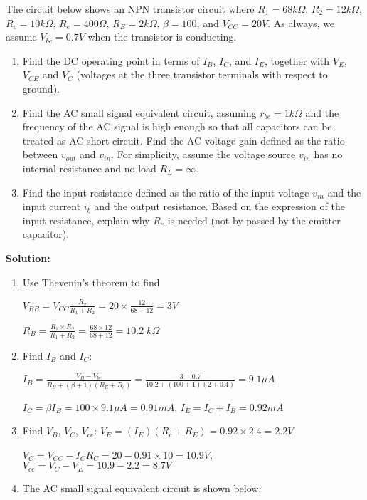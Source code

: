 \begin{enumerate}
The circuit below shows an NPN transistor circuit where $R_1=68k\Omega$,
$R_2=12k\Omega$, $R_c=10k\Omega$, $R_e=400\Omega$, $R_E=2k\Omega$, 
$\beta=100$, and $V_{CC}=20V$. As always, we assume $V_{be}=0.7V$ when
the transistor is conducting.


\begin{enumerate}
\item Find the DC operating point in terms of $I_B$, $I_C$, and $I_E$, 
  together with $V_E$, $V_{CE}$ and $V_C$ (voltages at the three transistor 
  terminals with respect to ground). 
\item Find the AC small signal equivalent circuit, assuming $r_{be}=1k\Omega$
  and the frequency of the AC signal is high enough so that all capacitors 
  can be treated as AC short circuit. Find the AC voltage gain defined as the 
  ratio between $v_{out}$ and $v_{in}$. For simplicity, assume the voltage
  source $v_{in}$ has no internal resistance and no load $R_L=\infty$.
\item Find the input resistance defined as the ratio of the input voltage
  $v_{in}$ and the input current $i_b$ and the output resistance. Based on
  the expression of the input resistance, explain why $R_e$ is needed (not
  by-passed by the emitter capacitor).
\end{enumerate}

{\bf Solution:}
\begin{enumerate}
\item Use Thevenin's theorem to find 

  $V_{BB}=V_{CC}\frac{R_2}{R_1+R_2}=20\times \frac{12}{68+12}=3V$

  $R_B=\frac{R_1\times R_2}{R_1+R_2}=\frac{68\times 12}{68+12}=10.2\;k\Omega$
\item Find $I_B$ and $I_C$:

  $I_B=\frac{V_B-V_{be}}{R_B+(\beta+1)(R_E+R_e)}
  =\frac{3-0.7}{10.2+(100+1)(2+0.4)}=9.1\mu A$

  $I_C=\beta I_B=100\times 9.1\mu A=0.91 mA$, $I_E=I_C+I_B=0.92 mA$

\item Find $V_B$, $V_C$, $V_{ce}$:
  $V_E=(I_E)(R_e+R_E)=0.92 \times 2.4=2.2V $

  $V_C=V_{CC}-I_CR_C=20-0.91\times 10=10.9V$, $V_{ce}=V_C-V_E=10.9-2.2=8.7V$

\item The AC small signal equivalent circuit is shown below:


\end{enumerate}
\end{enumerate}
